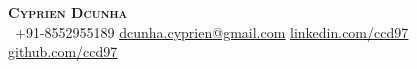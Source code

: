 \begin{center}
    \textbf{\Huge \scshape Cyprien Dcunha} \\ \vspace{1pt}
     \ \small +91-8552955189 \quad
    \href{mailto:dcunha.cyprien@gmail.com}{ \underline{dcunha.cyprien@gmail.com}} \quad
    \href{https://www.linkedin.com/in/ccd97/}{ \underline{linkedin.com/ccd97}} \quad
    \href{https://github.com/ccd97}{ \underline{github.com/ccd97}}
\end{center}